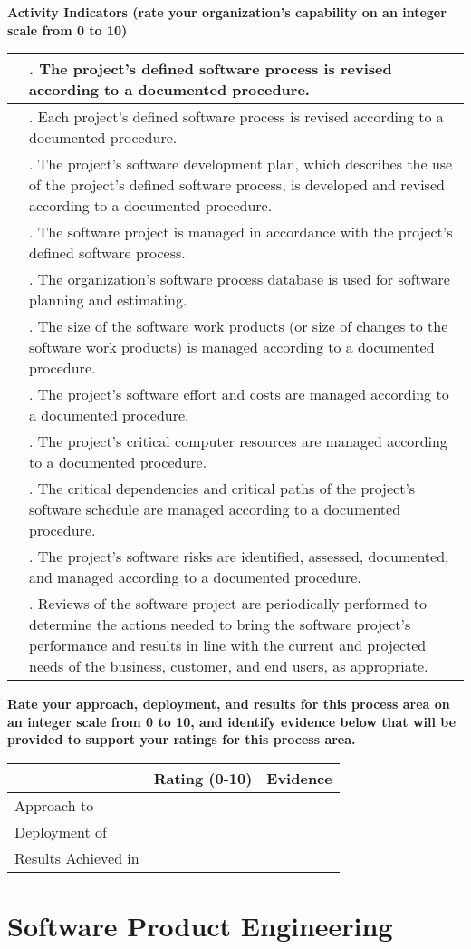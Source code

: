\documentclass{article}
\newcommand{\KPAname}{}
\let\KPAsection=\section
\renewcommand{\section}[1]{\renewcommand{\KPAname}{#1}\KPAsection{#1}}
\newcounter{activity}[section]		%
\newcounter{approach}[section]
\newcounter{deployment}[section]
\newcounter{result}[section]
\newcounter{score}
\newenvironment{KPAActivity}
{
    {\bf Activity Indicators (rate your organization's capability
    on an integer scale from 0 to 10)} %
    \begin{center}
    \begin{tabular}{|p{0.5in}|p{6.0in}|} \hline %
}
{
    \end{tabular}
    \end{center}
    \setcounter{approach}{\value{approach}/\value{activity}}
    \setcounter{deployment}{\value{deployment}/\value{activity}}
    \setcounter{result}{\value{result}/\value{activity}}
}
\newcommand{\Activity}[4]
{
    \stepcounter{activity} 
    \setcounter{score}{(#1+#2+#3)/3}
    \setcounter{approach}{\value{approach}+#1}
    \setcounter{deployment}{\value{deployment}+#1}
    \setcounter{result}{\value{result}+#1}
    \arabic{score} & \arabic{activity}. #4 \\ \hline
} %
\newenvironment{KPARate}
{
    {\bf Rate your approach, deployment, and results for
    this process area on an integer scale from 0 to 10, and 
    identify evidence below that will be provided to support your
    ratings for this process area.}
    \begin{center}
    \begin{tabular}{|p{1.0in}|p{0.5in}|p{5.0in}|} \hline
    & Rating (0-10) & \multicolumn{1}{c|}{Evidence} \\ \hline
}
{
    \end{tabular}
    \end{center}
}
\newcommand{\Approach}[1]
{
    Approach to \KPAname & \arabic{approach} & #1 \\ \hline
}
\newcommand{\Deployment}[1]
{
    Deployment of \KPAname & \arabic{deployment} & #1 \\ \hline
}
\newcommand{\Results}[1]
{
    Results Achieved in \KPAname & \arabic{result} & #1 \\ \hline
}
\begin{document}
\begin{KPAActivity}
\Activity{1}{1}{1}{The project's defined software process is revised
according to a documented procedure.}
\Activity{1}{1}{1}{Each project's defined software process is revised
according to a documented procedure.}
\Activity{2}{2}{2}{The project's software development plan, which describes
the use of the project's defined software process, is developed and
revised according to a documented procedure.}
\Activity{3}{3}{3}{The software project is managed in accordance with the
project's defined software process.}
\Activity{1}{1}{1}{The organization's software process database is used for
software planning and estimating.}
\Activity{1}{1}{1}{The size of the software work products (or size of changes
to the software work products) is managed according to a documented
procedure.}
\Activity{1}{1}{1}{The project's software effort and costs are managed
according to a documented procedure.}
\Activity{1}{1}{1}{The project's critical computer resources are managed
according to a documented procedure.}
\Activity{1}{1}{1}{The critical dependencies and critical paths of the
project's software schedule are managed according to a documented
procedure.}
\Activity{1}{1}{1}{The project's software risks are identified, assessed,
documented, and managed according to a documented procedure.}
\Activity{1}{1}{1}{Reviews of the software project are periodically performed
to determine the actions needed to bring the software project's
performance and results in line with the current and projected needs
of the business, customer, and end users, as appropriate.}
\end{KPAActivity}

\begin{KPARate}
\Approach{}
\Deployment{}
\Results{}
\end{KPARate}

\newpage
\section{Software Product Engineering}
\end{document}
